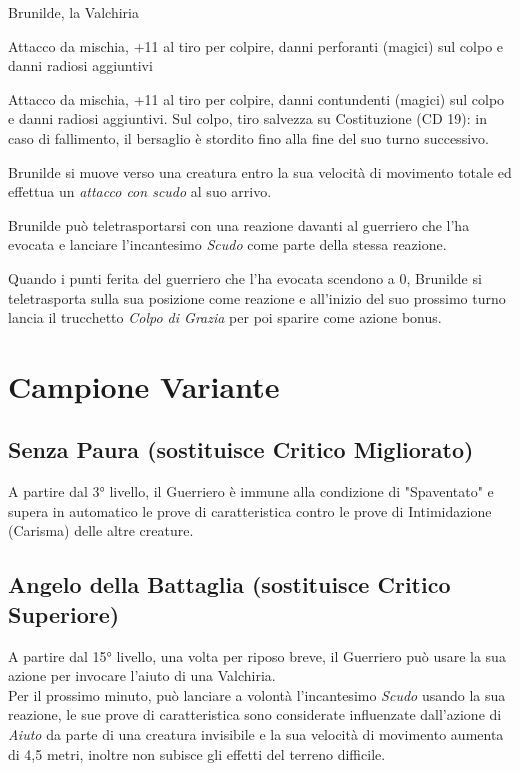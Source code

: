 \begin{DndMonster}[float*=b,width=\textwidth + 8pt]{Brunilde, la Valchiria}
\begin{multicols}{2}
    Attacco da mischia, +11 al tiro per colpire,  danni perforanti (magici) sul colpo e  danni radiosi aggiuntivi

    Attacco da mischia, +11 al tiro per colpire,  danni contundenti (magici) sul colpo e  danni radiosi aggiuntivi. Sul colpo, tiro salvezza su Costituzione (CD 19): in caso di fallimento, il bersaglio è stordito fino alla fine del suo turno successivo.

    
    Brunilde si muove verso una creatura entro la sua velocità di movimento totale ed effettua un \textit{attacco con scudo} al suo arrivo.


    Brunilde può teletrasportarsi con una reazione davanti al guerriero che l'ha evocata e lanciare l'incantesimo \textit{Scudo} come parte della stessa reazione.

    Quando i punti ferita del guerriero che l'ha evocata scendono a 0, Brunilde si teletrasporta sulla sua posizione come reazione e all'inizio del suo prossimo turno lancia il trucchetto \textit{Colpo di Grazia} per poi sparire come azione bonus.
  \end{multicols}
\end{DndMonster}

\section{Campione Variante}

\subsection{Senza Paura (sostituisce Critico Migliorato)}
A partire dal 3° livello, il Guerriero è immune alla condizione di "Spaventato" e supera in automatico le prove di caratteristica contro le prove di Intimidazione (Carisma) delle altre creature.

\subsection{Angelo della Battaglia (sostituisce Critico Superiore)}
A partire dal 15° livello, una volta per riposo breve, il Guerriero può usare la sua azione per invocare l'aiuto di una Valchiria.\\
Per il prossimo minuto, può lanciare a volontà l'incantesimo \textit{Scudo} usando la sua reazione, le sue prove di caratteristica sono considerate influenzate dall'azione di \textit{Aiuto} da parte di una creatura invisibile e la sua velocità di movimento aumenta di 4,5 metri, inoltre non subisce gli effetti del terreno difficile.

